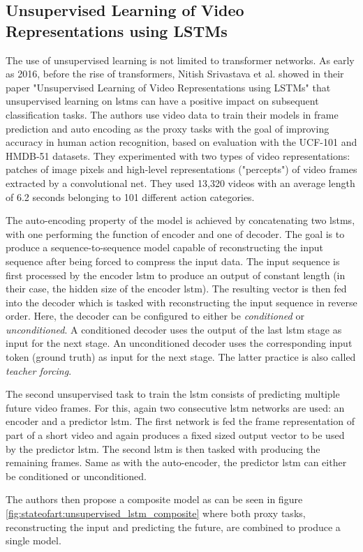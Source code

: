 \subsection{Unsupervised Learning of Video Representations using LSTMs} \label{sec:stateofart:unsupervised_video_lstm}

The use of unsupervised learning is not limited to transformer networks. As early as 2016, before the rise of transformers, Nitish Srivastava et al. showed in their paper "Unsupervised Learning of Video Representations using LSTMs" \cite{unsupervised_learning_lstms} that unsupervised learning on \glspl{lstm} can have a positive impact on subsequent classification tasks. The authors use video data to train their models in frame prediction and auto encoding as the proxy tasks with the goal of improving accuracy in human action recognition, based on evaluation with the UCF-101 and
HMDB-51 datasets. They experimented with two types of video representations: patches of image pixels and high-level representations ("percepts") of video frames extracted by a convolutional net. They used 13,320 videos with an average length of 6.2 seconds belonging to 101 different action categories. \par
The auto-encoding property of the model is achieved by concatenating two \glspl{lstm}, with one performing the function of encoder and one of decoder. The goal is to produce a sequence-to-sequence model capable of reconstructing the input sequence after being forced to compress the input data. The input sequence is first processed by the encoder \gls{lstm} to produce an output of constant length (in their case, the hidden size of the encoder \gls{lstm}). The resulting vector is then fed into the decoder which is tasked with reconstructing the input sequence in reverse order. Here, the decoder can be configured to either be \textit{conditioned} or \textit{unconditioned}. A conditioned decoder uses the output of the last \gls{lstm} stage as input for the next stage. An unconditioned decoder uses the corresponding input token (ground truth) as input for the next stage. The latter practice is also called \textit{teacher forcing}. \par
The second unsupervised task to train the \gls{lstm} consists of predicting multiple future video frames. For this, again two consecutive \gls{lstm} networks are used: an encoder and a predictor \gls{lstm}. The first network is fed the frame representation of part of a short video and again produces a fixed sized output vector to be used by the predictor \gls{lstm}. The second \gls{lstm} is then tasked with producing the remaining frames. Same as with the auto-encoder, the predictor \gls{lstm} can either be conditioned or unconditioned. \par
The authors then propose a composite model as can be seen in figure \ref{fig:stateofart:unsupervised_lstm_composite} where both proxy tasks, reconstructing the input and predicting the future, are combined to produce a single model.

